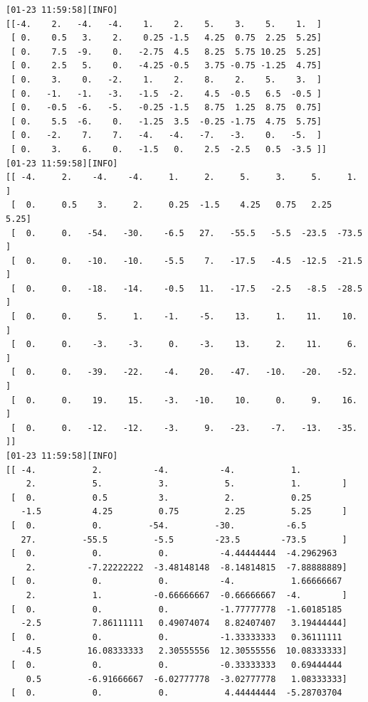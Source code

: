 \documentclass[
  letterpaper,
  DIV=11,
  numbers=noendperiod]{scrartcl}
\begin{document}
\begin{verbatim}
[01-23 11:59:58][INFO] 
[[-4.    2.   -4.   -4.    1.    2.    5.    3.    5.    1.  ]
 [ 0.    0.5   3.    2.    0.25 -1.5   4.25  0.75  2.25  5.25]
 [ 0.    7.5  -9.    0.   -2.75  4.5   8.25  5.75 10.25  5.25]
 [ 0.    2.5   5.    0.   -4.25 -0.5   3.75 -0.75 -1.25  4.75]
 [ 0.    3.    0.   -2.    1.    2.    8.    2.    5.    3.  ]
 [ 0.   -1.   -1.   -3.   -1.5  -2.    4.5  -0.5   6.5  -0.5 ]
 [ 0.   -0.5  -6.   -5.   -0.25 -1.5   8.75  1.25  8.75  0.75]
 [ 0.    5.5  -6.    0.   -1.25  3.5  -0.25 -1.75  4.75  5.75]
 [ 0.   -2.    7.    7.   -4.   -4.   -7.   -3.    0.   -5.  ]
 [ 0.    3.    6.    0.   -1.5   0.    2.5  -2.5   0.5  -3.5 ]]
[01-23 11:59:58][INFO] 
[[ -4.     2.    -4.    -4.     1.     2.     5.     3.     5.     1.  ]
 [  0.     0.5    3.     2.     0.25  -1.5    4.25   0.75   2.25   5.25]
 [  0.     0.   -54.   -30.    -6.5   27.   -55.5   -5.5  -23.5  -73.5 ]
 [  0.     0.   -10.   -10.    -5.5    7.   -17.5   -4.5  -12.5  -21.5 ]
 [  0.     0.   -18.   -14.    -0.5   11.   -17.5   -2.5   -8.5  -28.5 ]
 [  0.     0.     5.     1.    -1.    -5.    13.     1.    11.    10.  ]
 [  0.     0.    -3.    -3.     0.    -3.    13.     2.    11.     6.  ]
 [  0.     0.   -39.   -22.    -4.    20.   -47.   -10.   -20.   -52.  ]
 [  0.     0.    19.    15.    -3.   -10.    10.     0.     9.    16.  ]
 [  0.     0.   -12.   -12.    -3.     9.   -23.    -7.   -13.   -35.  ]]
[01-23 11:59:58][INFO] 
[[ -4.           2.          -4.          -4.           1.
    2.           5.           3.           5.           1.        ]
 [  0.           0.5          3.           2.           0.25
   -1.5          4.25         0.75         2.25         5.25      ]
 [  0.           0.         -54.         -30.          -6.5
   27.         -55.5         -5.5        -23.5        -73.5       ]
 [  0.           0.           0.          -4.44444444  -4.2962963
    2.          -7.22222222  -3.48148148  -8.14814815  -7.88888889]
 [  0.           0.           0.          -4.           1.66666667
    2.           1.          -0.66666667  -0.66666667  -4.        ]
 [  0.           0.           0.          -1.77777778  -1.60185185
   -2.5          7.86111111   0.49074074   8.82407407   3.19444444]
 [  0.           0.           0.          -1.33333333   0.36111111
   -4.5         16.08333333   2.30555556  12.30555556  10.08333333]
 [  0.           0.           0.          -0.33333333   0.69444444
    0.5         -6.91666667  -6.02777778  -3.02777778   1.08333333]
 [  0.           0.           0.           4.44444444  -5.28703704

\end{verbatim}
\end{document}
